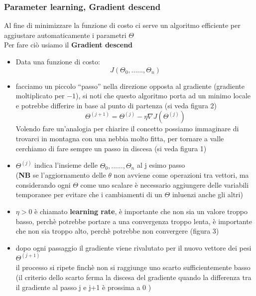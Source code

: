 \documentclass[10pt,oneside,a4paper]{article}
\begin{document}
 \subsubsection{Parameter learning, Gradient descend}
Al fine di minimizzare la funzione di costo ci serve un algoritmo efficiente per aggiustare automaticamente i parametri $\Theta$ \\
Per fare ciò usiamo il \textbf{Gradient descend} 
 \begin{itemize}
\item Data una funzione di costo:
$$J(\Theta_{0},......,\Theta_{n})$$
\item facciamo un piccolo ``passo'' nella direzione opposta al gradiente (gradiente moltiplicato per $-1$), si noti che questo algoritmo porta ad un minimo locale e potrebbe differire in base al punto di partenza (si veda figura 2)
$$\Theta^{(j+1)} = \Theta^{(j)}-\eta \nabla J(\Theta^{(j)})$$
Volendo fare un'analogia per chiarire il concetto possiamo immaginare di trovarci in montagna con una nebbia molto fitta, per tornare a valle cerchiamo di fare sempre un passo in discesa (si veda figura 1)



\item $\Theta^{(j)}$ indica l'insieme delle $\Theta_{0},......,\Theta_{n}$ al j esimo passo \\
(\textbf{NB} se l'aggiornamento delle $\theta $ non avviene come operazioni tra vettori, ma considerando ogni $\Theta$ come uno scalare è necessario aggiungere delle variabili temporanee per evitare che i cambiamenti di un $\Theta$ inluenzi anche gli altri)

\item $\eta > 0$ è chiamato \textbf{learning rate}, è importante che non sia un valore troppo basso, perchè potrebbe portare a una convergenza troppo lenta, è importante che non sia troppo alto, perchè potrebbe non convergere (figura 3)

\item dopo ogni passaggio il gradiente viene rivalutato per il nuovo vettore dei pesi $\Theta^{(j+1)}$ 
\\ il processo si ripete finchè non si raggiunge uno scarto sufficientemente basso (il criterio dello scarto ferma la discesa del gradiente quando la differenza tra il gradiente al passo j e j+1 è prossima a 0 )


\end{itemize}
\end{document}
